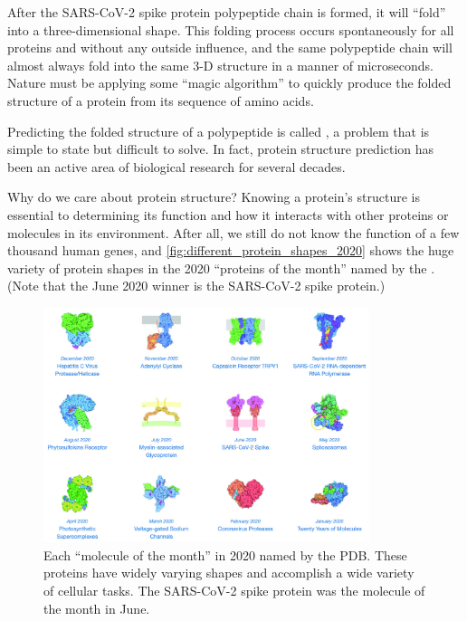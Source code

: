 After the SARS-CoV-2 spike protein polypeptide chain is formed, it will ``fold'' into a three-dimensional shape. This folding process occurs spontaneously for all proteins and without any outside influence, and the same polypeptide chain will almost always fold into the same 3-D structure in a manner of microseconds. Nature must be applying some ``magic algorithm'' to quickly produce the folded structure of a protein from its sequence of amino acids.

Predicting the folded structure of a polypeptide is called , a problem that is simple to state but difficult to solve. In fact, protein structure prediction has been an active area of biological research for several decades.

Why do we care about protein structure? Knowing a protein's structure is essential to determining its function and how it interacts with other proteins or molecules in its environment. After all, we still do not know the function of a few thousand human genes, and \autoref{fig:different_protein_shapes_2020} shows the huge variety of protein shapes in the 2020 ``proteins of the month'' named by the . (Note that the June 2020 winner is the SARS-CoV-2 spike protein.)

\begin{figure}[h]
	\centering
	\mySfFamily
	\includegraphics[width = 0.85\textwidth]{../images_CMYK/different_protein_shapes_2020}
	\caption{Each ``molecule of the month'' in 2020 named by the PDB. These proteins have widely varying shapes and accomplish a wide variety of cellular tasks. The SARS-CoV-2 spike protein was the molecule of the month in June.}
	\label{fig:different_protein_shapes_2020}
\end{figure}

